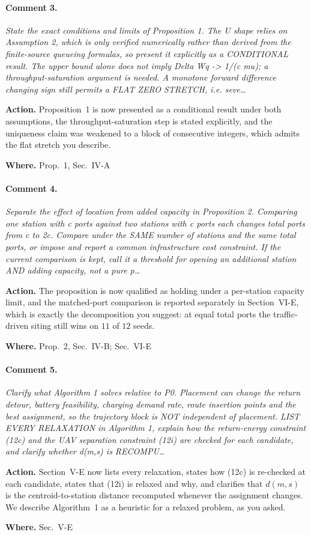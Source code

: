 \documentclass[10pt]{article}
\newcommand{\rev}[1]{\par\medskip\noindent\textit{#1}\par\smallskip}
\newcommand{\act}[2]{\noindent\textbf{Action.} #1\par\noindent\textbf{Where.} #2\par}
\begin{document}
\paragraph{Comment 3.}
\rev{State the exact conditions and limits of Proposition 1. The U shape relies on Assumption 2, which is only verified numerically rather than derived from the finite-source queueing formulas, so present it explicitly as a CONDITIONAL result. The upper bound alone does not imply Delta Wq -> 1/(c mu); a throughput-saturation argument is needed. A monotone forward difference changing sign still permits a FLAT ZERO STRETCH, i.e. seve\dots}
\act{Proposition~1 is now presented as a conditional result under both assumptions, the throughput-saturation step is stated explicitly, and the uniqueness claim was weakened to a block of consecutive integers, which admits the flat stretch you describe.}{Prop.~1, Sec.~IV-A}

\paragraph{Comment 4.}
\rev{Separate the effect of location from added capacity in Proposition 2. Comparing one station with c ports against two stations with c ports each changes total ports from c to 2c. Compare under the SAME number of stations and the same total ports, or impose and report a common infrastructure cost constraint. If the current comparison is kept, call it a threshold for opening an additional station AND adding capacity, not a pure p\dots}
\act{The proposition is now qualified as holding under a per-station capacity limit, and the matched-port comparison is reported separately in Section~VI-E, which is exactly the decomposition you suggest: at equal total ports the traffic-driven siting still wins on $11$ of $12$ seeds.}{Prop.~2, Sec.~IV-B; Sec.~VI-E}

\paragraph{Comment 5.}
\rev{Clarify what Algorithm 1 solves relative to P0. Placement can change the return detour, battery feasibility, charging demand rate, route insertion points and the best assignment, so the trajectory block is NOT independent of placement. LIST EVERY RELAXATION in Algorithm 1, explain how the return-energy constraint (12c) and the UAV separation constraint (12i) are checked for each candidate, and clarify whether d(m,s) is RECOMPU\dots}
\act{Section~V-E now lists every relaxation, states how (12c) is re-checked at each candidate, states that (12i) is relaxed and why, and clarifies that $d(m,s)$ is the centroid-to-station distance recomputed whenever the assignment changes. We describe Algorithm~1 as a heuristic for a relaxed problem, as you asked.}{Sec.~V-E}
\end{document}
